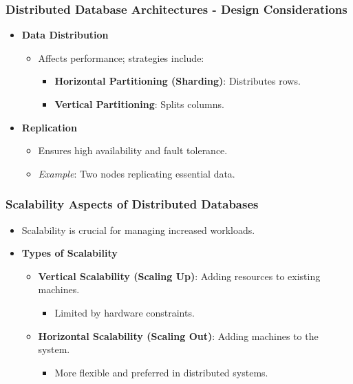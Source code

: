 \documentclass[aspectratio=169]{beamer}
\begin{document}
\begin{frame}[fragile]
    \frametitle{Distributed Database Architectures - Design Considerations}
    \begin{itemize}
        \item \textbf{Data Distribution}
            \begin{itemize}
                \item Affects performance; strategies include:
                    \begin{itemize}
                        \item \textbf{Horizontal Partitioning (Sharding)}: Distributes rows.
                        \item \textbf{Vertical Partitioning}: Splits columns.
                    \end{itemize}
            \end{itemize}

        \item \textbf{Replication}
            \begin{itemize}
                \item Ensures high availability and fault tolerance.
                \item \textit{Example}: Two nodes replicating essential data.
            \end{itemize}
    \end{itemize}
\end{frame}

\begin{frame}[fragile]
    \frametitle{Scalability Aspects of Distributed Databases}
    \begin{itemize}
        \item Scalability is crucial for managing increased workloads.
        \item \textbf{Types of Scalability}
            \begin{itemize}
                \item \textbf{Vertical Scalability (Scaling Up)}: Adding resources to existing machines. 
                    \begin{itemize}
                        \item Limited by hardware constraints.
                    \end{itemize}
                \item \textbf{Horizontal Scalability (Scaling Out)}: Adding machines to the system.
                    \begin{itemize}
                        \item More flexible and preferred in distributed systems.
                    \end{itemize}
            \end{itemize}
    \end{itemize}
\end{frame}
\end{document}
